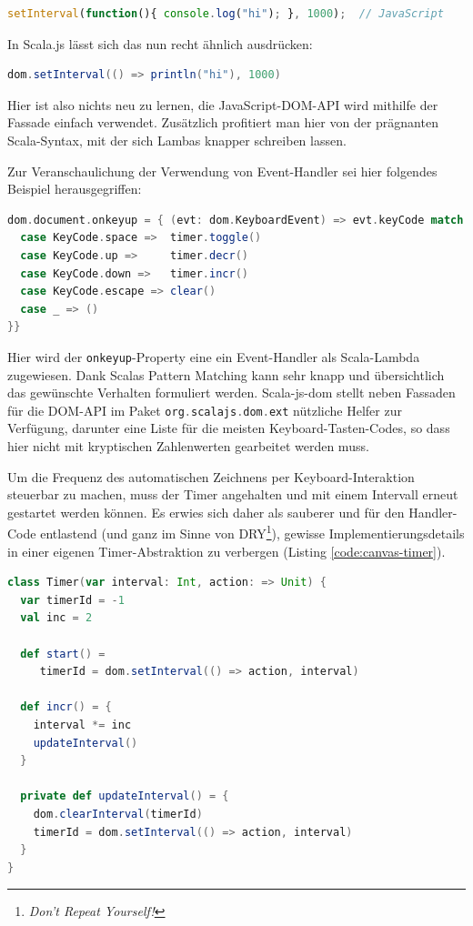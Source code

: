 \documentclass[a4paper, 12pt, hidelinks, listof=totoc, listoftables=totoc, bibliography=totoc]{scrreprt}
\newcommand{\scala}[1]{\lstinline[language=Scala, style=inline]|#1|}
\begin{document}
\begin{lstlisting}[language=JavaScript, style=snippet]
setInterval(function(){ console.log("hi"); }, 1000);  // JavaScript
\end{lstlisting}

In Scala.js lässt sich das nun recht ähnlich ausdrücken:

\begin{lstlisting}[language=Scala, style=snippet]
dom.setInterval(() => println("hi"), 1000)
\end{lstlisting}

Hier ist also nichts neu zu lernen, die JavaScript-\ac{DOM}-\ac{API} wird mithilfe der Fassade einfach verwendet. Zusätzlich profitiert man hier von der prägnanten Scala-Syntax, mit der sich Lambas knapper schreiben lassen.

Zur Veranschaulichung der Verwendung von Event-Handler sei hier folgendes Beispiel herausgegriffen:

\begin{lstlisting}[language=Scala, style=snippet]
dom.document.onkeyup = { (evt: dom.KeyboardEvent) => evt.keyCode match {
  case KeyCode.space =>  timer.toggle()
  case KeyCode.up =>     timer.decr()
  case KeyCode.down =>   timer.incr()
  case KeyCode.escape => clear()
  case _ => ()
}}
\end{lstlisting}

Hier wird der \scala{onkeyup}-Property eine ein Event-Handler als Scala-Lambda zugewiesen. Dank Scalas Pattern Matching kann sehr knapp und übersichtlich das gewünschte Verhalten formuliert werden. Scala-js-dom stellt neben Fassaden für die \ac{DOM}-\ac{API} im Paket \scala{org.scalajs.dom.ext} nützliche Helfer zur Verfügung, darunter eine Liste für die meisten Keyboard-Tasten-Codes, so dass hier nicht mit kryptischen Zahlenwerten gearbeitet werden muss.

Um die Frequenz des automatischen Zeichnens per Keyboard-Interaktion steuerbar zu machen, muss der Timer angehalten und mit einem Intervall erneut gestartet werden können. Es erwies sich daher als sauberer und für den Handler-Code entlastend (und ganz im Sinne von DRY\footnote{\emph{Don't Repeat Yourself!}}), gewisse Implementierungsdetails in einer eigenen Timer-Abstraktion zu verbergen (Listing \ref{code:canvas-timer}).
		
\begin{lstlisting}[language=Scala, caption={Timer-Klasse des Canvas-Beispiels.}, label={code:canvas-timer}]
class Timer(var interval: Int, action: => Unit) {
  var timerId = -1
  val inc = 2

  def start() =
     timerId = dom.setInterval(() => action, interval)
   
  def incr() = {
    interval *= inc
    updateInterval()
  }

  private def updateInterval() = {
    dom.clearInterval(timerId)
    timerId = dom.setInterval(() => action, interval)
  }
}
\end{lstlisting}
\end{document}

